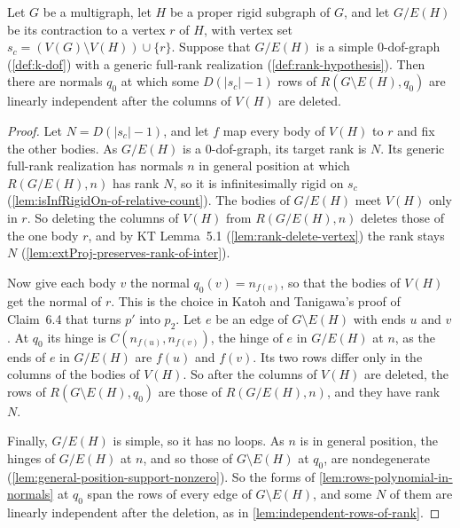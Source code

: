 \begin{lemma}
  \label{lem:claim-6-4}
  \leanok
  Let $G$ be a multigraph, let $H$ be a proper rigid subgraph of $G$, and
  let $G/E(H)$ be its contraction to a vertex $r$ of $H$, with vertex set
  $s_c = (V(G) \setminus V(H)) \cup \{r\}$. Suppose that $G/E(H)$ is a
  simple $0$-dof-graph (\cref{def:k-dof}) with a generic full-rank
  realization (\cref{def:rank-hypothesis}). Then there are normals $q_0$
  at which some $D(|s_c| - 1)$ rows of $R(G \setminus E(H), q_0)$ are
  linearly independent after the columns of $V(H)$ are deleted.
\end{lemma}
\begin{proof}
  \leanok
  Let $N = D(|s_c| - 1)$, and let $f$ map every body of $V(H)$ to $r$ and
  fix the other bodies. As $G/E(H)$ is a $0$-dof-graph, its target rank
  is $N$. Its generic full-rank realization has normals $n$ in general
  position at which $R(G/E(H), n)$ has rank $N$, so it is infinitesimally
  rigid on $s_c$ (\cref{lem:isInfRigidOn-of-relative-count}). The bodies
  of $G/E(H)$ meet $V(H)$ only in $r$. So deleting the columns of $V(H)$
  from $R(G/E(H), n)$ deletes those of the one body $r$, and by KT
  Lemma~5.1 (\cref{lem:rank-delete-vertex}) the rank stays $N$
  (\cref{lem:extProj-preserves-rank-of-inter}).

  Now give each body $v$ the normal $q_0(v) = n_{f(v)}$, so that the
  bodies of $V(H)$ get the normal of $r$. This is the choice in Katoh and
  Tanigawa's proof of Claim~6.4 that turns $p'$ into $p_2$. Let $e$ be an
  edge of $G \setminus E(H)$ with ends $u$ and $v$. At $q_0$ its hinge is
  $C(n_{f(u)}, n_{f(v)})$, the hinge of $e$ in $G/E(H)$ at $n$, as the
  ends of $e$ in $G/E(H)$ are $f(u)$ and $f(v)$. Its two rows differ only
  in the columns of the bodies of $V(H)$. So after the columns of $V(H)$
  are deleted, the rows of
  $R(G \setminus E(H), q_0)$ are those of $R(G/E(H), n)$, and they have
  rank $N$.

  Finally, $G/E(H)$ is simple, so it has no loops. As $n$ is in general
  position, the hinges of $G/E(H)$ at $n$, and so those of
  $G \setminus E(H)$ at $q_0$, are nondegenerate
  (\cref{lem:general-position-support-nonzero}). So the forms of
  \cref{lem:rows-polynomial-in-normals} at $q_0$ span the rows of every
  edge of $G \setminus E(H)$, and some $N$ of them are linearly
  independent after the deletion, as in
  \cref{lem:independent-rows-of-rank}.
\end{proof}

